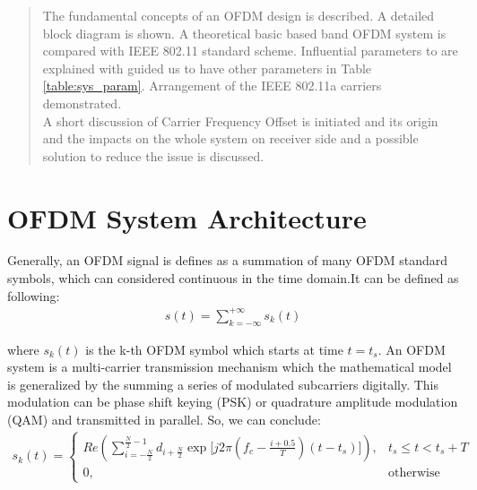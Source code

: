 \begin{abstract}
The fundamental concepts of an OFDM design is described. A detailed block diagram is shown. A theoretical basic based band OFDM system is compared with IEEE 802.11 standard scheme. Influential parameters to are explained with guided us to have other parameters in Table \ref{table:sys_param}. Arrangement of the IEEE 802.11a carriers demonstrated.\\
A short discussion of Carrier Frequency Offset is initiated and its origin and the impacts on the whole system on receiver side and a possible solution to reduce the issue is discussed.\\

\end{abstract}

\section{OFDM System Architecture}
Generally, an OFDM signal is defines as a summation of many OFDM standard symbols, which can considered continuous in the time domain.It can be defined as following:\\

\begin{equation} \label{general_form}
\begin{split}
s(t) =\sum\limits_{k=-\infty}^{+\infty} s_{k}(t)
\end{split}
\end{equation}

where $s_{k}(t)$ is the k-th OFDM symbol which starts at time $t= t_{s}$. An OFDM system is a multi-carrier transmission mechanism which the mathematical model is generalized by the summing a series of modulated subcarriers digitally. This modulation can be phase shift keying (PSK) or quadrature amplitude modulation (QAM) and transmitted in parallel. So, we can  conclude:\\
\begin{equation} \label{ofdm_digital_mod}
\begin{split}
s_{k}(t)=
\left\{
	\begin{array}{ll}
	Re\left( \sum\limits_{i=-\frac{N}{2}}^{\frac{N}{2}-1} d_{i+\frac{N}{2}} \exp\lbrack j2\pi(f_{c} - \frac{i+0.5}{T})(t- t_{s})\rbrack\right) , & t_{s}\le t < t_{s} + T\\
	0, & \mbox{otherwise}
	\end{array}
\right.
\end{split}
\end{equation}

